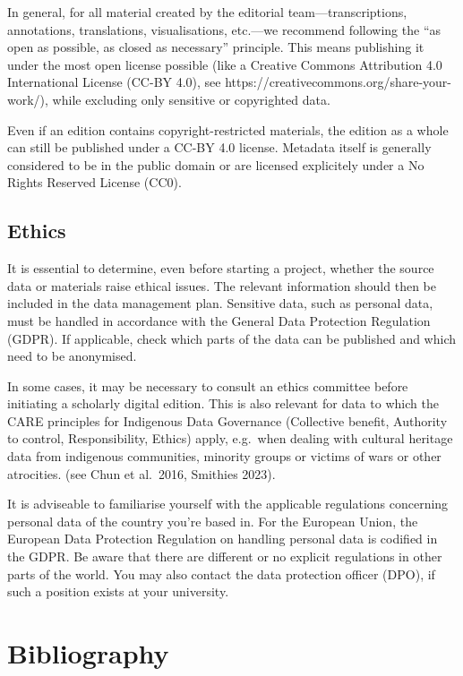 \documentclass[
  letterpaper,
  DIV=11,
  numbers=noendperiod]{scrreprt}
\begin{document}
In general, for all material created by the editorial
team---transcriptions, annotations, translations, visualisations,
etc.---we recommend following the ``as open as possible, as closed as
necessary'' principle. This means publishing it under the most open
license possible (like a Creative Commons Attribution 4.0 International
License (CC-BY 4.0), see https://creativecommons.org/share-your-work/),
while excluding only sensitive or copyrighted data.

Even if an edition contains copyright-restricted materials, the edition
as a whole can still be published under a CC-BY 4.0 license. Metadata
itself is generally considered to be in the public domain or are
licensed explicitely under a No Rights Reserved License (CC0).

\subsection{Ethics}\label{ethics}

It is essential to determine, even before starting a project, whether
the source data or materials raise ethical issues. The relevant
information should then be included in the data management plan.
Sensitive data, such as personal data, must be handled in accordance
with the General Data Protection Regulation (GDPR). If applicable, check
which parts of the data can be published and which need to be
anonymised.

In some cases, it may be necessary to consult an ethics committee before
initiating a scholarly digital edition. This is also relevant for data
to which the CARE principles for Indigenous Data Governance (Collective
benefit, Authority to control, Responsibility, Ethics) apply, e.g.~when
dealing with cultural heritage data from indigenous communities,
minority groups or victims of wars or other atrocities. (see Chun et
al.~2016, Smithies 2023).

It is adviseable to familiarise yourself with the applicable regulations
concerning personal data of the country you're based in. For the
European Union, the European Data Protection Regulation on handling
personal data is codified in the GDPR. Be aware that there are different
or no explicit regulations in other parts of the world. You may also
contact the data protection officer (DPO), if such a position exists at
your university.

\section{Bibliography}\label{bibliography-1}
\end{document}
